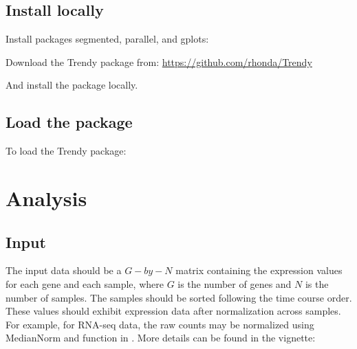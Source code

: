 \documentclass{article}
\begin{document}
\subsection{Install locally}

Install packages segmented, parallel, and gplots:


\begin{knitrout}
\color{fgcolor}\begin{kframe}
\begin{alltt}
\hlstd{(}\hlstd{)}
\hlstd{(}\hlstd{)}
\hlstd{(}\hlstd{)}
\end{alltt}
\end{kframe}
\end{knitrout}

Download the Trendy package from: \url{https://github.com/rhonda/Trendy}

And install the package locally.


\subsection{Load the package}

To load the Trendy package:
\begin{knitrout}
\color{fgcolor}\begin{kframe}
\begin{alltt}
\end{alltt}
\end{kframe}
\end{knitrout}

\section{Analysis}

\subsection{Input}

The input data should be a $G-by-N$ matrix containing the expression values 
for each gene and each sample, where $G$ is the number of genes and $N$ 
is the number of samples.
The samples should be sorted following the time course order.
These values should exhibit expression data after normalization across
samples.
For example, for RNA-seq data, the raw counts may be normalized using
MedianNorm and  function in . 
More details can be found in the  vignette:
\end{document}
